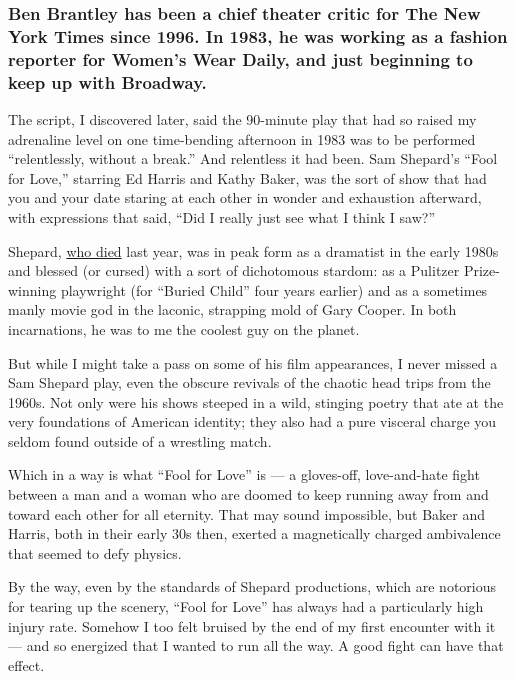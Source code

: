 \hypertarget{ben-brantley-has-been-a-chief-theater-critic-for-the-new-york-times-since-1996-in-1983-he-was-working-as-a-fashion-reporter-for-womens-wear-daily-and-just-beginning-to-keep-up-with-broadway}{%
\subsubsection{Ben Brantley has been a chief theater critic for The New
York Times since 1996. In 1983, he was working as a fashion reporter for
Women's Wear Daily, and just beginning to keep up with
Broadway.}\label{ben-brantley-has-been-a-chief-theater-critic-for-the-new-york-times-since-1996-in-1983-he-was-working-as-a-fashion-reporter-for-womens-wear-daily-and-just-beginning-to-keep-up-with-broadway}}

The script, I discovered later, said the 90-minute play that had so
raised my adrenaline level on one time-bending afternoon in 1983 was to
be performed ``relentlessly, without a break.'' And relentless it had
been. Sam Shepard's ``Fool for Love,'' starring Ed Harris and Kathy
Baker, was the sort of show that had you and your date staring at each
other in wonder and exhaustion afterward, with expressions that said,
``Did I really just see what I think I saw?''

Shepard,
\href{https://www.nytimes.com/2017/07/31/theater/sam-shepard-dead.html}{who
died} last year, was in peak form as a dramatist in the early 1980s and
blessed (or cursed) with a sort of dichotomous stardom: as a Pulitzer
Prize-winning playwright (for ``Buried Child'' four years earlier) and
as a sometimes manly movie god in the laconic, strapping mold of Gary
Cooper. In both incarnations, he was to me the coolest guy on the
planet.

But while I might take a pass on some of his film appearances, I never
missed a Sam Shepard play, even the obscure revivals of the chaotic head
trips from the 1960s. Not only were his shows steeped in a wild,
stinging poetry that ate at the very foundations of American identity;
they also had a pure visceral charge you seldom found outside of a
wrestling match.

Which in a way is what ``Fool for Love'' is --- a gloves-off,
love-and-hate fight between a man and a woman who are doomed to keep
running away from and toward each other for all eternity. That may sound
impossible, but Baker and Harris, both in their early 30s then, exerted
a magnetically charged ambivalence that seemed to defy physics.

By the way, even by the standards of Shepard productions, which are
notorious for tearing up the scenery, ``Fool for Love'' has always had a
particularly high injury rate. Somehow I too felt bruised by the end of
my first encounter with it --- and so energized that I wanted to run all
the way. A good fight can have that effect.

